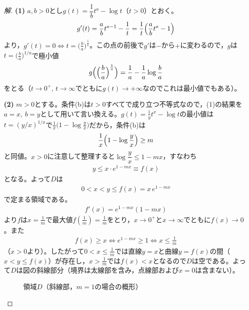 \documentclass[../main.tex]{subfiles}
\begin{document}
\begin{proof}[解]
  \textbf{(1)} $a,b>0$とし$g(t)=\dfrac1bt^a-\log t$（$t>0$）とおく。
  \begin{align*}
    g'(t)=\frac abt^{a-1}-\frac1t=\frac1t\Bigl(\frac abt^a-1\Bigr)
  \end{align*}
  より，$g'(t)=0\iff t=\bigl(\frac ba\bigr)^{\frac1a}$。この点の前後で$g'$は$-$から$+$に変わるので，$g$は$t=\bigl(\frac ba\bigr)^{1/a}$で極小値
  \begin{align*}
    g\Bigl(\Bigl(\frac ba\Bigr)^{\frac1a}\Bigr)=\frac1a-\frac1a\log\frac ba
  \end{align*}
  をとる（$t\to0^+,\,t\to\infty$でともに$g(t)\to+\infty$なのでこれは最小値でもある）。

  \textbf{(2)} $m>0$とする。条件(b)は$t>0$すべてで成り立つ不等式なので，(1)の結果を$a=x,\ b=y$として用いて言い換える。$g(t)=\frac1yt^x-\log t$の最小値は$t=(y/x)^{1/x}$で$\frac1x\bigl(1-\log\frac yx\bigr)$だから，条件(b)は
  \begin{align*}
    \frac1x\Bigl(1-\log\frac yx\Bigr)\ge m
  \end{align*}
  と同値。$x>0$に注意して整理すると$\log\dfrac yx\le1-mx$，すなわち
  \begin{align*}
    y\le x\cdot e^{1-mx}\equiv f(x)
  \end{align*}
  となる。よって$D$は
  \begin{align*}
    0<x<y\le f(x)=x\,e^{1-mx}
  \end{align*}
  で定まる領域である。
  \begin{align*}
    f'(x)=e^{1-mx}(1-mx)
  \end{align*}
  より$f$は$x=\frac1m$で最大値$f(\frac1m)=\frac1m$をとり，$x\to0^+$と$x\to\infty$でともに$f(x)\to0$。また
  \begin{align*}
    f(x)\ge x\iff e^{1-mx}\ge1\iff x\le\frac1m
  \end{align*}
  （$x>0$より）。したがって$0<x\le\frac1m$では直線$y=x$と曲線$y=f(x)$の間（$x<y\le f(x)$）が存在し，$x>\frac1m$では$f(x)<x$となるので$D$は空である。よって$D$は図の斜線部分（境界は太線部を含み，点線部および$x=0$は含まない）。

  \begin{figure}[htb]
    \centering
    \caption{領域$D$（斜線部，$m=1$の場合の概形）}
  \end{figure}


\end{proof}
\end{document}
